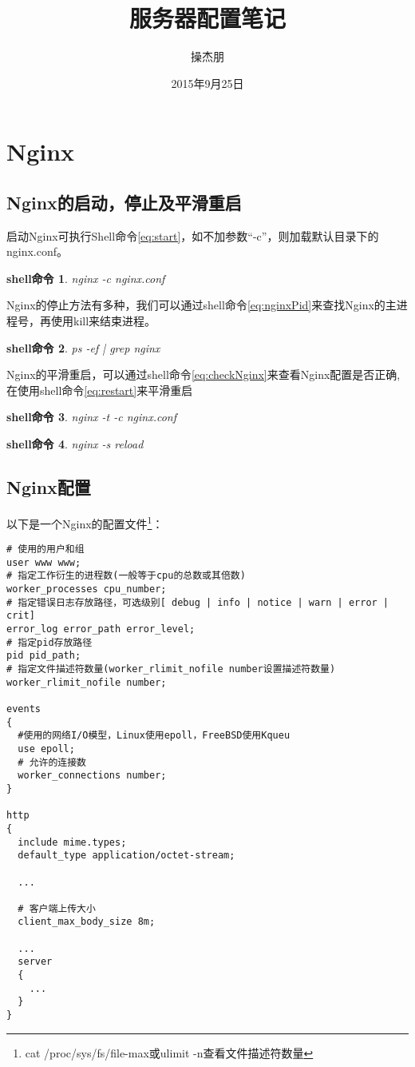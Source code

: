 \documentclass[UTF8]{ctexart}
\title{\heiti 服务器配置笔记}
\author{\kaishu 操杰朋}
\date{2015年9月25日}
\newtheorem{shellcommand}{shell命令}
\begin{document}
\maketitle
\clearpage

\tableofcontents
\clearpage

\section{Nginx}
\subsection{Nginx的启动，停止及平滑重启}
启动Nginx可执行Shell命令\eqref{eq:start}，如不加参数“-c”，则加载默认目录下的nginx.conf。

\begin{shellcommand}
  nginx -c nginx.conf \label{eq:start}
\end{shellcommand}

Nginx的停止方法有多种，我们可以通过shell命令\eqref{eq:nginxPid}来查找Nginx的主进程号，再使用kill来结束进程。

\begin{shellcommand}
  ps -ef | grep nginx \label{eq:nginxPid}
\end{shellcommand}

Nginx的平滑重启，可以通过shell命令\eqref{eq:checkNginx}来查看Nginx配置是否正确,在使用shell命令\eqref{eq:restart}来平滑重启
\begin{shellcommand}
  nginx -t -c nginx.conf \label{eq:checkNginx}
\end{shellcommand}
\begin{shellcommand}
  nginx -s reload \label{eq:restart}
\end{shellcommand}

\subsection{Nginx配置}
以下是一个Nginx的配置文件\footnote{cat /proc/sys/fs/file-max或ulimit -n查看文件描述符数量}：

\begin{verbatim}
# 使用的用户和组
user www www;
# 指定工作衍生的进程数(一般等于cpu的总数或其倍数)
worker_processes cpu_number;
# 指定错误日志存放路径，可选级别[ debug | info | notice | warn | error | crit]
error_log error_path error_level;
# 指定pid存放路径
pid pid_path;
# 指定文件描述符数量(worker_rlimit_nofile number设置描述符数量)
worker_rlimit_nofile number;

events
{
  #使用的网络I/O模型，Linux使用epoll，FreeBSD使用Kqueu
  use epoll;
  # 允许的连接数
  worker_connections number;
}

http
{
  include mime.types;
  default_type application/octet-stream;

  ...

  # 客户端上传大小
  client_max_body_size 8m;

  ...
  server
  {
    ...
  }
}
\end{verbatim}
\end{document}
